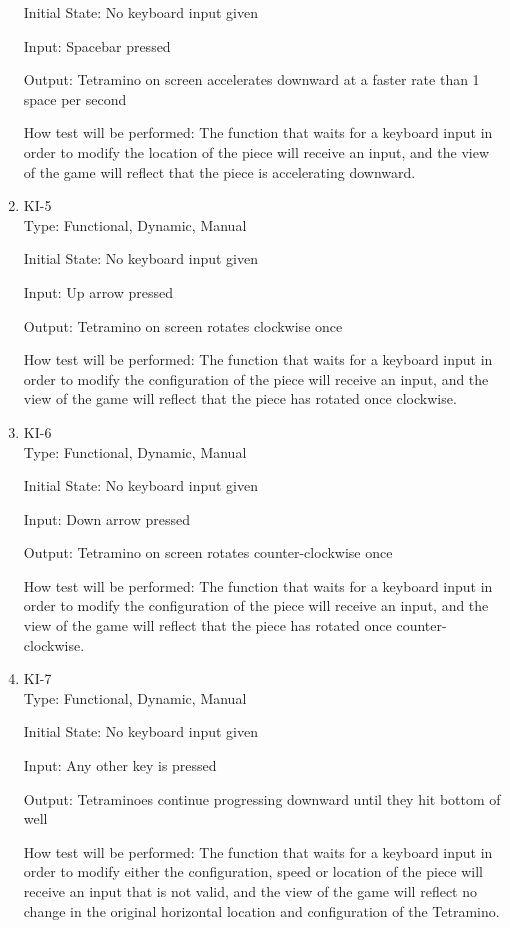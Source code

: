 \documentclass[12pt, titlepage]{article}
\begin{document}
\begin{enumerate}
Initial State: No keyboard input given
					
Input: Spacebar pressed
					
Output: Tetramino on screen accelerates downward at a faster rate than 1 space per second
					
How test will be performed: The function that waits for a keyboard input in order to modify the location of the piece will receive an input, and the view of the game will reflect that the piece is accelerating downward.

\item{KI-5\\}
Type: Functional, Dynamic, Manual
					
Initial State: No keyboard input given
					
Input: Up arrow pressed
					
Output: Tetramino on screen rotates clockwise once
					
How test will be performed: The function that waits for a keyboard input in order to modify the configuration of the piece will receive an input, and the view of the game will reflect that the piece has rotated once clockwise.

\item{KI-6\\}
Type: Functional, Dynamic, Manual
					
Initial State: No keyboard input given
					
Input: Down arrow pressed
					
Output: Tetramino on screen rotates counter-clockwise once
					
How test will be performed: The function that waits for a keyboard input in order to modify the configuration of the piece will receive an input, and the view of the game will reflect that the piece has rotated once counter-clockwise.

\item{KI-7\\}
Type: Functional, Dynamic, Manual
					
Initial State: No keyboard input given
					
Input: Any other key is pressed
					
Output: Tetraminoes continue progressing downward until they hit bottom of well
					
How test will be performed: The function that waits for a keyboard input in order to modify either the configuration, speed or location of the piece will receive an input that is not valid, and the view of the game will reflect no change in the original horizontal location and configuration of the Tetramino.
\end{enumerate}
\end{document}
